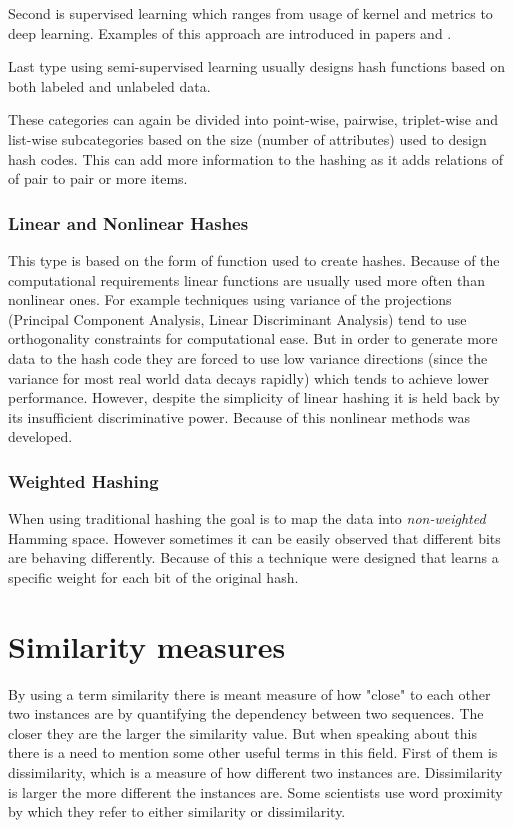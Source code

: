Second is supervised learning which ranges from usage of kernel and metrics to deep learning. Examples of this approach are introduced in papers \cite{LM1} and 
\cite{LM2}.

Last type using semi-supervised learning usually designs hash functions based on both labeled and unlabeled data.

These categories can again be divided into point-wise, pairwise, triplet-wise and list-wise subcategories based on the size (number of attributes) used to design hash codes. This can add more information to the hashing as it adds relations of of pair to pair or more items.

\subsubsection{Linear and Nonlinear Hashes}
This type is based on the form of function used to create hashes. Because of the computational requirements linear functions are usually used more often than nonlinear ones. For example techniques using variance of the projections (Principal Component Analysis, Linear Discriminant Analysis) tend to use orthogonality constraints for computational ease. But in order to generate more data to the hash code they are forced to use low variance directions (since the variance for most real world data decays rapidly) which tends to achieve lower performance.
However, despite the simplicity of linear hashing it is held back by its insufficient discriminative power. Because of this nonlinear methods was developed.

\subsubsection{Weighted Hashing}
When using traditional hashing the goal is to map the data into \textit{non-weighted} Hamming space. However sometimes it can be easily observed that different bits are behaving differently. Because of this a technique were designed that learns a specific weight for each bit of the original hash.



\section{Similarity measures}
By using a term similarity there is meant measure of how "close" to each other two instances are by quantifying the dependency between two sequences. The closer they are the larger the similarity value. But when speaking about this there is a need to mention some other useful terms in this field. First of them is dissimilarity, which is a measure of how different two instances are. Dissimilarity is larger the more different the instances are. Some scientists use word proximity by which they refer to either similarity or dissimilarity.

